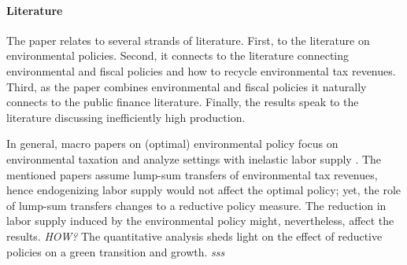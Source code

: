 \paragraph{Literature}
The paper relates to several strands of literature. 
First, to the literature on environmental policies. Second, it connects to the literature connecting environmental and fiscal policies and how to recycle environmental tax revenues. Third, as the paper combines environmental and fiscal policies it naturally connects to the public finance literature. Finally, the results speak to the literature discussing inefficiently high production.
 

In general, macro papers on (optimal) environmental policy focus on environmental taxation and analyze settings with inelastic labor supply \citep{Golosov2014OptimalEquilibrium, Acemoglu2012TheChang, Fried2018ClimateAnalysis, Acemoglu2016TransitionTechnology}. The mentioned papers assume lump-sum transfers of environmental tax revenues, hence endogenizing labor supply would not affect the optimal policy; yet, the role of lump-sum transfers changes to a reductive policy measure. The reduction in labor supply induced by the environmental policy might, nevertheless, affect the results. \textit{HOW?}
The quantitative analysis sheds light on the effect of reductive policies on a green transition and growth. \textit{sss}


